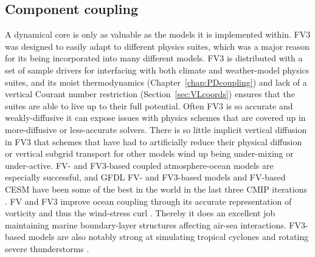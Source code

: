 \documentclass[10pt,letterpaper,margin=1in]{memoir}
\begin{document}
\subsection{Component coupling} A dynamical core is only as valuable as the models it is implemented within. FV3 was designed to easily adapt to different physics suites, which was a major reason for its being incorporated into many different models. FV3 is distributed with a set of sample drivers for interfacing with both climate and weather-model physics suites, and its moist thermodynamics (Chapter~\ref{chap:PDcoupling}) and lack of a vertical Courant number restriction (Section~\ref{sec:VLcoords}) ensures that the suites are able to live up to their full potential. Often FV3 is so accurate and weakly-diffusive it can expose issues with physics schemes that are covered up in more-diffusive or less-accurate solvers. There is so little implicit vertical diffusion in FV3 that schemes that have had to artificially reduce their physical diffusion or vertical subgrid transport for other models wind up being under-mixing or under-active. FV- and FV3-based coupled atmosphere-ocean models are especially successful, and GFDL FV- and FV3-based models and FV-based CESM have been some of the best in the world in the last three CMIP iterations \citep{Boucher2019,Bock2020,Brunner2020}. FV and FV3 improve ocean coupling through its accurate representation of vorticity and thus the wind-stress curl \citep{Delworth2006}. Thereby it does an excellent job maintaining marine boundary-layer structures affecting air-sea interactions. FV3-based models are also notably strong at simulating tropical cyclones \citep{Zhao2009,ChenLin2013,Gao2021,JHChen2018,Hazelton2018a} and rotating severe thunderstorms \citep{AClark2018,Harris2019}.
  
\end{document}
